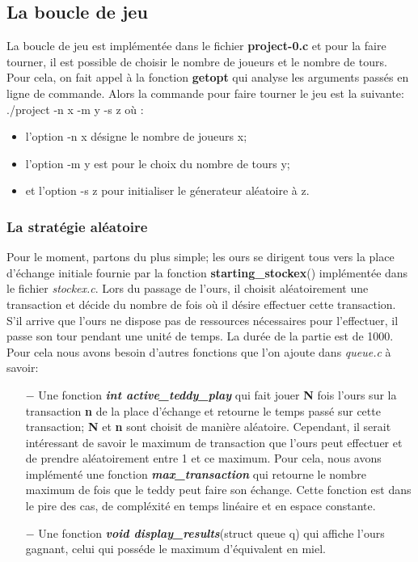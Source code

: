\documentclass[a4paper,12pt]{article}
\begin{document}
  \subsection{La boucle de jeu}

La boucle de jeu est implémentée dans le fichier \textbf{project-0.c} et pour la faire tourner, il est possible de choisir le nombre de joueurs et le nombre de tours. Pour cela, on fait appel à la fonction \textbf{getopt} qui analyse les arguments passés en ligne de commande. Alors la commande pour faire tourner le jeu est la suivante: ./project -n x -m y -s z où :
\begin{itemize}
\item l'option -n x désigne le nombre de joueurs x;
\item l'option -m y est pour le choix du nombre de tours y;
\item et l'option -s z pour initialiser le génerateur aléatoire à z.
\end{itemize}
    \subsubsection{La stratégie aléatoire}

Pour le moment, partons du plus simple; les ours se dirigent tous vers la place d’échange initiale fournie par la fonction \textbf{starting\_stockex}() implémentée dans le fichier \emph{stockex.c}. Lors du passage de l'ours, il choisit aléatoirement une transaction et décide du nombre de fois où il désire effectuer cette transaction.  S'il arrive que l'ours ne dispose pas de ressources nécessaires pour l'effectuer, il passe son tour pendant une unité de temps. La durée de la partie est de 1000. \\
Pour cela nous avons besoin d'autres fonctions que l'on ajoute dans \emph{queue.c} à savoir:
\newline
\begin{itemize}
\item[$-$] Une fonction \emph{\textbf{int active\_teddy\_play}} qui fait jouer \textbf{N} fois l'ours sur la transaction \textbf{n} de la place d'échange et retourne le temps passé sur cette transaction; \textbf{N} et \textbf{n} sont choisit de manière aléatoire. Cependant, il serait intéressant de savoir le maximum de transaction que l'ours peut effectuer et de prendre aléatoirement entre 1 et ce maximum. Pour cela, nous avons implémenté une fonction \emph{\textbf{max\_transaction}} qui retourne le nombre maximum de fois que le teddy peut faire son échange. Cette fonction est dans le pire des cas, de compléxité en temps linéaire et en espace constante.
\newline
\item[$-$] Une fonction \emph{\textbf{void display\_results}}(struct queue q) qui affiche l'ours gagnant, celui qui posséde le maximum d'équivalent en miel.
\newline
\end{itemize}
\end{document}
